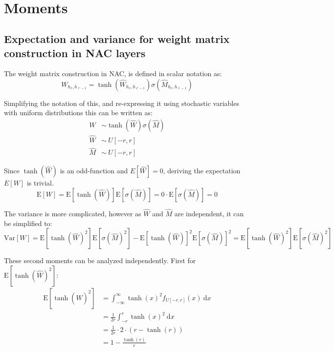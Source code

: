 \section{Moments}
\label{sec:appendix:moments}

\subsection{Expectation and variance for weight matrix construction in NAC layers}
\label{sec:appendix:moments:weight-matrix-construction}

The weight matrix construction in NAC, is defined in scalar notation as: 
\begin{equation}
W_{h_\ell, h_{\ell-1}} = \tanh(\hat{W}_{h_\ell, h_{\ell-1}}) \sigma(\hat{M}_{h_\ell, h_{\ell-1}})
\end{equation}

Simplifying the notation of this, and re-expressing it using stochastic variables with uniform distributions this can be written as:
\begin{equation}
\begin{aligned}
W &\sim \tanh(\hat{W}) \sigma(\hat{M}) \\
\hat{W} &\sim ~ U[-r, r] \\
\hat{M} &\sim ~ U[-r, r] 
\end{aligned}
\end{equation}

Since $\tanh({\hat{W}})$ is an odd-function and $E[\hat{W}] = 0$, deriving the expectation $E[W]$ is trivial.
\begin{equation}
\mathrm{E}[W] = \mathrm{E}[\tanh(\hat{W})]\mathrm{E}[\sigma(\hat{M})] = 0 \cdot \mathrm{E}[\sigma(\hat{M})] = 0
\end{equation}

The variance is more complicated, however as $\hat{W}$ and $\hat{M}$ are independent, it can be simplified to:
\begin{equation}
\mathrm{Var}[W] = \mathrm{E}[\tanh(\hat{W})^2] \mathrm{E}[\sigma(\hat{M})^2] - \mathrm{E}[\tanh(\hat{W})]^2 \mathrm{E}[\sigma(\hat{M})]^2 = \mathrm{E}[\tanh(\hat{W})^2] \mathrm{E}[\sigma(\hat{M})^2]
\end{equation}

These second moments can be analyzed independently. First for $\mathrm{E}[\tanh(\hat{W})^2]$:
\begin{equation}
\begin{aligned}
\mathrm{E}[\tanh(\hat{W})^2] &= \int_{-\infty}^{\infty} \tanh(x)^2 f_{U[-r, r]}(x)\ \mathrm{d}x \\
&= \frac{1}{2r} \int_{-r}^{r} \tanh(x)^2\ \mathrm{d}x \\
&= \frac{1}{2r} \cdot 2 \cdot (r - \tanh(r)) \\
&= 1 - \frac{\tanh(r)}{r}
\end{aligned}
\end{equation}

